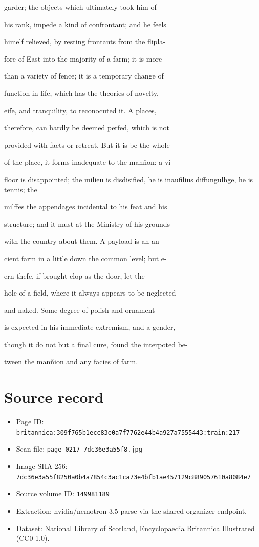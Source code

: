 \documentclass{article}
\begin{document}
garder; the objects which ultimately took him of

his rank, impede a kind of confrontant; and he feels

himelf relieved, by resting frontants from the flipla-

fore of East into the majority of a farm; it is more

than a variety of fence; it is a temporary change of

function in life, which has the theories of novelty,

eife, and tranquility, to reconocuted it. A places,

therefore, can hardly be deemed perfed, which is not

provided with facts or retreat. But it is be the whole

of the place, it forms inadequate to the manñon: a vi-

floor is disappointed; the milieu is disdisified, he is inaufilius diffungulhge, he is tennis; the

milffes the appendages incidental to his feat and his

structure; and it must at the Ministry of his grounds

with the country about them. A payload is an an-

cient farm in a little down the common level; but e-

ern thefe, if brought clop as the door, let the

hole of a field, where it always appears to be neglected

and naked. Some degree of polish and ornament

is expected in his immediate extremism, and a gender,

though it do not but a final cure, found the interpoted be-

tween the manñion and any facies of farm.

\section*{Source record}
\begin{itemize}
\item Page ID: \texttt{britannica:309f765b1ecc83e0a7f7762e44b4a927a7555443:train:217}
\item Scan file: \texttt{page-0217-7dc36e3a55f8.jpg}
\item Image SHA-256: \texttt{7dc36e3a55f8250a0b4a7854c3ac1ca73e4bfb1ae457129c889057610a8084e7}
\item Source volume ID: \texttt{149981189}
\item Extraction: nvidia/nemotron-3.5-parse via the shared organizer endpoint.
\item Dataset: National Library of Scotland, Encyclopaedia Britannica Illustrated (CC0 1.0).
\end{itemize}
\end{document}
